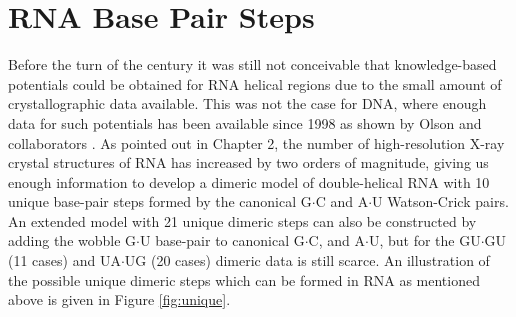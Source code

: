 \chapter{RNA Base Pair Steps}
\label{basepairsteps} 

Before  the turn  of the  century it  was still  not  conceivable that
knowledge-based potentials  could be obtained for  RNA helical regions
due to the  small amount of crystallographic data  available. This was
not the case  for DNA, where enough data for  such potentials has been
available   since   1998  as   shown   by   Olson  and   collaborators
\cite{olson1998}.   As  pointed  out  in  Chapter  2,  the  number  of
high-resolution X-ray  crystal structures of RNA has  increased by two
orders of magnitude, giving us enough information to develop a dimeric
model of double-helical  RNA with 10 unique base-pair  steps formed by
the canonical G$\cdot$C and  A$\cdot$U Watson-Crick pairs. An extended
model with 21  unique dimeric steps can also  be constructed by adding
the wobble G$\cdot$U base-pair  to canonical G$\cdot$C, and A$\cdot$U,
but for the GU$\cdot$GU (11  cases) and UA$\cdot$UG (20 cases) dimeric
data is still  scarce. An illustration of the  possible unique dimeric
steps which can be formed in RNA as mentioned above is given in Figure
\ref{fig:unique}.

